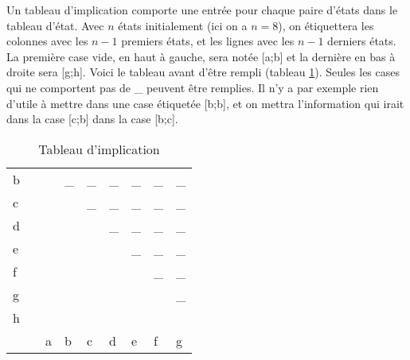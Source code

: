 \documentclass[11pt]{article}
\begin{document}
Un tableau d'implication comporte une entrée pour chaque paire d'états
dans le tableau d'état. Avec \(n\) états initialement (ici on a
\(n=8\)), on étiquettera les colonnes avec les \(n-1\) premiers états,
et les lignes avec les \(n-1\) derniers états. La première case vide,
en haut à gauche, sera notée [a;b] et la dernière en bas à droite sera
[g;h]. Voici le tableau avant d'être rempli (tableau
\ref{tab:orgb1a60dc}). Seules les cases qui ne comportent pas de \_
peuvent être remplies. Il n'y a par exemple rien d'utile à mettre dans
une case étiquetée [b;b], et on mettra l'information qui irait dans la
case [c;b] dans la case [b;c].

\begin{table}[htbp]
\caption{\label{tab:orgb1a60dc}Tableau d'implication}
\centering
\begin{tabular}{lllllllll}
b &  &  & \_ & \_ & \_ & \_ & \_ & \_\\[0pt]
c &  &  &  & \_ & \_ & \_ & \_ & \_\\[0pt]
d &  &  &  &  & \_ & \_ & \_ & \_\\[0pt]
e &  &  &  &  &  & \_ & \_ & \_\\[0pt]
f &  &  &  &  &  &  & \_ & \_\\[0pt]
g &  &  &  &  &  &  &  & \_\\[0pt]
h &  &  &  &  &  &  &  & \\[0pt]
\hline
 &  & a & b & c & d & e & f & g\\[0pt]
\end{tabular}
\end{table}
\end{document}
